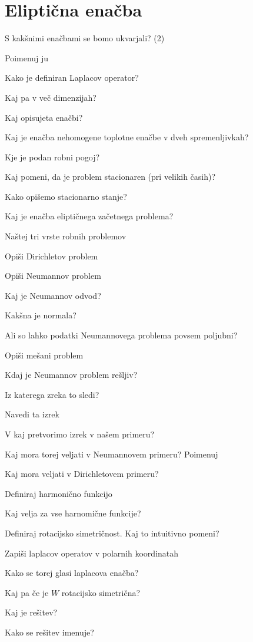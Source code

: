 \documentclass{article}
\begin{document}
    \section{Eliptična enačba}
    \begin{enumerate}
        {\color{red}\item S kakšnimi enačbami se bomo ukvarjali? (2)}
        \item Poimenuj ju
        \item Kako je definiran Laplacov operator?
        \item Kaj pa v več dimenzijah?
        \item Kaj opisujeta enačbi?
        {\color{red}\item Kaj je enačba nehomogene toplotne enačbe v dveh spremenljivkah?}
        {\color{red}\item Kje je podan robni pogoj?}
        {\color{red}\item Kaj pomeni, da je problem stacionaren (pri velikih časih)?}
        {\color{red}\item Kako opišemo stacionarno stanje?}
        {\color{red}\item Kaj je enačba eliptičnega začetnega problema? }
        \item Naštej tri vrste robnih problemov
        {\color{red}\item Opiši Dirichletov problem}
        \item Opiši Neumannov problem
        \item Kaj je Neumannov odvod?
        {\color{red}\item Kakšna je normala?}
        \item Ali so lahko podatki Neumannovega problema povsem poljubni?
        {\color{red}\item Opiši mešani problem}
        {\color{red}\item Kdaj je Neumannov problem rešljiv?}
        {\color{red}\item Iz katerega zreka to sledi?}
        {\color{red}\item Navedi ta izrek}
        {\color{red}\item V kaj pretvorimo izrek v našem primeru?}
        {\color{red}\item Kaj mora torej veljati v Neumannovem primeru? Poimenuj}
        {\color{red}\item Kaj mora veljati v Dirichletovem primeru?}
        \item Definiraj harmonično funkcijo
        {\color{red}\item Kaj velja za vse harnomične funkcije?}
        \item Definiraj rotacijsko simetričnost. Kaj to intuitivno pomeni?
        {\color{red}\item Zapiši laplacov operatov v polarnih koordinatah}
        \item Kako se torej glasi laplacova enačba?
        \item Kaj pa če je $W$ rotacijsko simetrična?
        {\color{red}\item Kaj je rešitev?}
        {\color{red}\item Kako se rešitev imenuje?}
    \end{enumerate}
\end{document}
